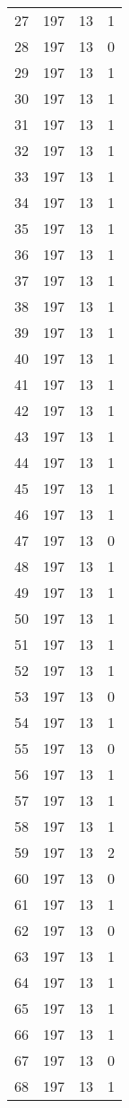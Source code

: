 \begin{longtable}[!]{c|ccc}
	27	& 197	& 13	& 1	\\
	28	& 197	& 13	& 0	\\
	29	& 197	& 13	& 1	\\
	30	& 197	& 13	& 1	\\
	31	& 197	& 13	& 1	\\
	32	& 197	& 13	& 1	\\
	33	& 197	& 13	& 1	\\
	34	& 197	& 13	& 1	\\
	35	& 197	& 13	& 1	\\
	36	& 197	& 13	& 1	\\
	37	& 197	& 13	& 1	\\
	38	& 197	& 13	& 1	\\
	39	& 197	& 13	& 1	\\
	40	& 197	& 13	& 1	\\
	41	& 197	& 13	& 1	\\
	42	& 197	& 13	& 1	\\
	43	& 197	& 13	& 1	\\
	44	& 197	& 13	& 1	\\
	45	& 197	& 13	& 1	\\
	46	& 197	& 13	& 1	\\
	47	& 197	& 13	& 0	\\
	48	& 197	& 13	& 1	\\
	49	& 197	& 13	& 1	\\
	50	& 197	& 13	& 1	\\
	51	& 197	& 13	& 1	\\
	52	& 197	& 13	& 1	\\
	53	& 197	& 13	& 0	\\
	54	& 197	& 13	& 1	\\
	55	& 197	& 13	& 0	\\
	56	& 197	& 13	& 1	\\
	57	& 197	& 13	& 1	\\
	58	& 197	& 13	& 1	\\
	59	& 197	& 13	& 2	\\
	60	& 197	& 13	& 0	\\
	61	& 197	& 13	& 1	\\
	62	& 197	& 13	& 0	\\
	63	& 197	& 13	& 1	\\
	64	& 197	& 13	& 1	\\
	65	& 197	& 13	& 1	\\
	66	& 197	& 13	& 1	\\
	67	& 197	& 13	& 0	\\
	68	& 197	& 13	& 1	\\

\end{longtable}
